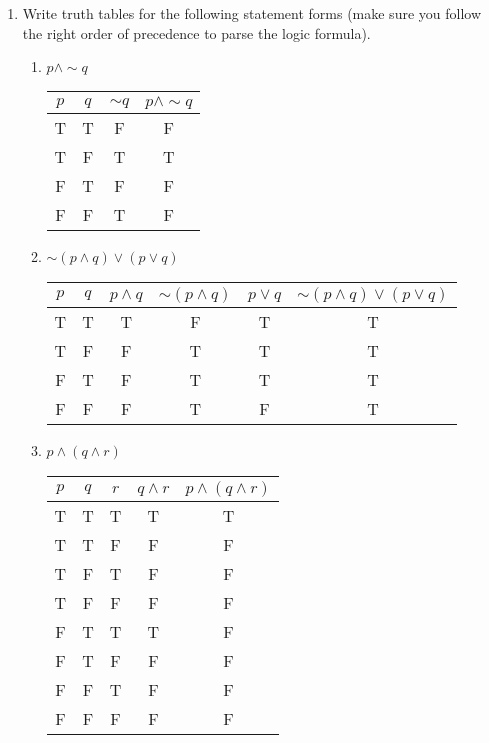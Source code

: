 \documentclass{article}
\begin{document}
\begin{enumerate}
		\item Write truth tables for the following statement forms (make sure you follow the right order of precedence to parse the logic formula).
		\begin{enumerate}
			\item \( p \land \sim q \) \\
			
			\begin{tabular}{|c|c|c|c|}
				\hline
				$p$ & $q$ & $\sim q$ & $p \land \sim q$ \\
				\hline
				T & T & F & F \\
				T & F & T & T \\
				F & T & F & F \\
				F & F & T & F \\
				\hline
			\end{tabular}
			
			\item \( \sim (p \land q) \lor (p \lor q) \) \\
			
			\begin{tabular}{|c|c|c|c|c|c|}
				\hline
				$p$ & $q$ & $p \land q$ & $\sim (p \land q)$ & $p \lor q$ & $\sim (p \land q) \lor (p \lor q)$ \\
				\hline
				T & T & T & F & T & T \\
				T & F & F & T & T & T \\
				F & T & F & T & T & T \\
				F & F & F & T & F & T \\
				\hline
			\end{tabular}
			
			\item \( p \land (q \land r) \) \\
			
			\begin{tabular}{|c|c|c|c|c|}
				\hline
				$p$ & $q$ & $r$ & $q \land r$ & $p \land (q \land r)$ \\
				\hline
				T & T & T & T & T \\
				T & T & F & F & F \\
				T & F & T & F & F \\
				T & F & F & F & F \\
				F & T & T & T & F \\
				F & T & F & F & F \\
				F & F & T & F & F \\
				F & F & F & F & F \\
				\hline
			\end{tabular}
			

\end{enumerate}
\end{enumerate}
\end{document}
